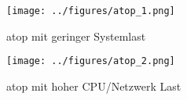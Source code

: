 \begin{figure}
  \centering
  \texttt{[image: ../figures/atop\_1.png]}
  \caption{atop mit geringer Systemlast}
  \label{figure:atop1}
\end{figure}

\begin{figure}
  \centering
  \texttt{[image: ../figures/atop\_2.png]}
  \caption{atop mit hoher CPU/Netzwerk Last}
  \label{figure:atop2}
\end{figure}
